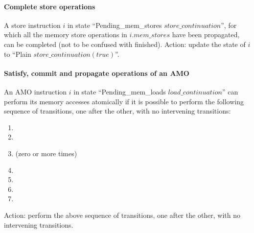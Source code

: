 \paragraph{Complete store operations}\label{omm:complete_stores}
A store instruction $i$ in state ``{\sc Pending\_mem\_stores} $store\_continuation$'', for which all the memory store operations in $i.mem\_stores$ have been propagated, can be completed (not to be confused with finished).
Action: update the state of $i$ to ``{\sc Plain} $store\_continuation(true)$''.


\paragraph{Satisfy, commit and propagate operations of an AMO}\label{omm:do_amo}
An AMO instruction $i$ in state ``{\sc Pending\_mem\_loads} $load\_continuation$'' can perform its memory accesses atomically if it is possible to perform the following sequence of transitions, one after the other, with no intervening transitions:
\begin{enumerate}
\item {}
\item {}
\item {} (zero or more times)
\item {}
\item {}
\item {}
\item {}
\end{enumerate}
Action: perform the above sequence of transitions, one after the other, with no intervening transitions.


